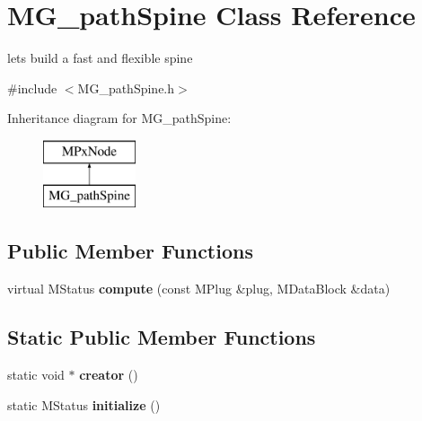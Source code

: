 \hypertarget{class_m_g__path_spine}{\section{M\-G\-\_\-path\-Spine Class Reference}
\label{class_m_g__path_spine}
}


lets build a fast and flexible spine  




{\ttfamily \#include $<$M\-G\-\_\-path\-Spine.\-h$>$}

Inheritance diagram for M\-G\-\_\-path\-Spine\-:\begin{figure}[H]
\begin{center}
\leavevmode
\includegraphics[height=2.000000cm]{class_m_g__path_spine}
\end{center}
\end{figure}
\subsection*{Public Member Functions}
\begin{DoxyCompactItemize}
\item 
\hypertarget{class_m_g__path_spine_a99684427fff3fbdb3137ca170d837006}{virtual M\-Status {\bfseries compute} (const M\-Plug \&plug, M\-Data\-Block \&data)}\label{class_m_g__path_spine_a99684427fff3fbdb3137ca170d837006}

\end{DoxyCompactItemize}
\subsection*{Static Public Member Functions}
\begin{DoxyCompactItemize}
\item 
\hypertarget{class_m_g__path_spine_ad76fe22353cfb17b5304fdb5983b11b3}{static void $\ast$ {\bfseries creator} ()}\label{class_m_g__path_spine_ad76fe22353cfb17b5304fdb5983b11b3}

\item 
\hypertarget{class_m_g__path_spine_a8df28dcaabc6098519fc0f7519425cc9}{static M\-Status {\bfseries initialize} ()}\label{class_m_g__path_spine_a8df28dcaabc6098519fc0f7519425cc9}

\end{DoxyCompactItemize}
